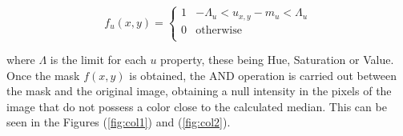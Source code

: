 \begin{equation}
f_{u}(x,y) = \left\{
\begin{array}{ll}


      1 & -\Lambda_u < u_{x, y} - m_u < \Lambda_u \\
      
      
      
      0 & \text{otherwise} \\
      
      
\end{array} 
\right.
\end{equation}

where $\Lambda $ is the limit for each $u$ property, these being Hue, Saturation or Value. Once the mask $f(x,y)$ is obtained, the AND operation is carried out between the mask and the original image, obtaining a null intensity in the pixels of the image that do not possess a color close to the calculated median. This can be seen in the Figures (\ref{fig:col1}) and (\ref{fig:col2}).


